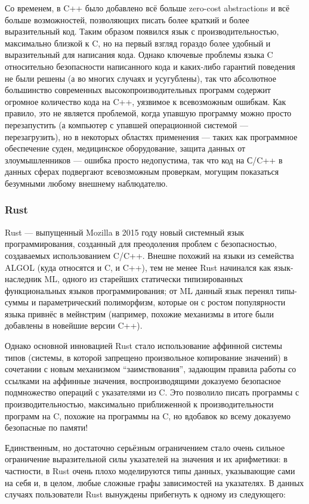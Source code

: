 \documentclass[12pt]{article}
\begin{document}
Со временем, в C++ было добавлено всё больше zero-cost abstractions и всё больше
возможностей, позволяющих писать более краткий и более выразительный код. Таким
образом появился язык с производительностью, максимально близкой к C, но на
первый взгляд гораздо более удобный и выразительный для написания кода. Однако
ключевые проблемы языка C относительно безопасности написанного кода и
каких-либо гарантий поведения не были решены (а во многих случаях и усугублены),
так что абсолютное большинство современных высокопроизводительных программ
содержит огромное количество кода на C++, уязвимое к всевозможным ошибкам. Как
правило, это не является проблемой, когда упавшую программу можно просто
перезапустить (а компьютер с упавшей операционной системой --- перезагрузить),
но в некоторых областях применения --- таких как программное обеспечение суден,
медицинское оборудование, защита данных от злоумышленников --- ошибка просто
недопустима, так что код на С/C++ в данных сферах подвергают всевозможным
проверкам, могущим показаться безумными любому внешнему наблюдателю.

\subsubsection{Rust}

Rust --- выпущенный Mozilla в 2015 году новый системный язык программирования,
созданный для преодоления проблем с безопасностью, создаваемых использованием
C/C++. Внешне похожий на языки из семейства ALGOL (куда относятся и C, и C++),
тем не менее Rust начинался как язык-наследник ML, одного из старейших
статически типизированных функциональных языков программирования; от ML данный
язык перенял типы-суммы и параметрический полиморфизм, которые он с ростом
популярности языка привнёс в мейнстрим (например, похожие механизмы в итоге были
добавлены в новейшие версии C++).

Однако основной инновацией Rust стало использование аффинной системы типов
(системы, в которой запрещено произвольное копирование значений) в сочетании с
новым механизмом ``заимствования'', задающим правила работы со ссылками на
аффинные значения, воспроизводящими доказуемо безопасное подмножество операций с
указателями из C. Это позволило писать программы с производительностью,
максимально приближенной к производительности программ на C, похожие на
программы на C, но вдобавок ко всему доказуемо безопасные по памяти!

Единственным, но достаточно серьёзным ограничением стало очень сильное \\
ограничение выразительной силы указателей на значения и их арифметики: в
частности, в Rust очень плохо моделируются типы данных, указывающие сами на
себя и, в целом, любые сложные графы зависимостей на указателях. В данных
случаях пользователи Rust вынуждены прибегнуть к одному из следующего:
\end{document}
